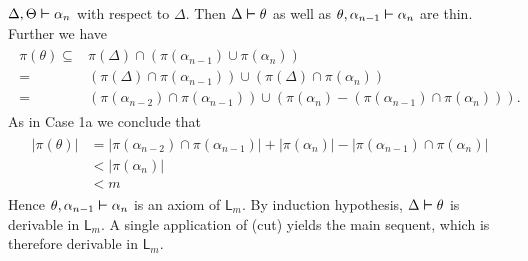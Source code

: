 $\Delta, \Theta \boldsymbol{\vdash} \alpha_n$ with respect to $\Delta$.
Then $\Delta \boldsymbol{\vdash} \theta$ as well as $\theta, \alpha_{n-1}
\boldsymbol{\vdash} \alpha_n$ are thin. Further we have
\begin{align}
\begin{split}
\pi(\theta) \subseteq & \pi(\Delta) \cap (\pi(\alpha_{n-1}) \cup
\pi(\alpha_n)) \\
	 = & (\pi(\Delta) \cap \pi(\alpha_{n-1})) \cup
(\pi(\Delta) \cap \pi(\alpha_n))  \\
        = & 
	(\pi(\alpha_{n-2}) \cap \pi(\alpha_{n-1})) 
	\cup
        (\pi(\alpha_n) - (\pi(\alpha_{n-1}) \cap \pi(\alpha_n))).
\end{split}
\end{align}
As in Case 1a we conclude that
\begin{align}
\begin{split}
|\pi(\theta)| & = 
    |\pi(\alpha_{n-2}) \cap \pi(\alpha_{n-1})| +
    |\pi(\alpha_n)| - |\pi(\alpha_{n-1}) \cap \pi(\alpha_n)| \\
          & < 
    |\pi(\alpha_n)| \\
          & < m
	\end{split}
\end{align}
Hence $\theta, \alpha_{n-1} \boldsymbol{\vdash} \alpha_n$ is an axiom of
$\mathsf{L}_m$. By induction hypothesis, $\Delta \boldsymbol{\vdash} \theta$ 
is derivable in $\mathsf{L}_m$. A single application of (cut) yields 
the main sequent, which is therefore derivable in $\mathsf{L}_m$.
\proofend


